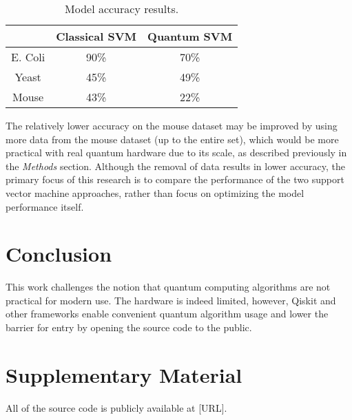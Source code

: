 \documentclass{article}
\begin{document}
    \begin{table}[h]
      \centering
      \begin{tabular}{c|c|c|}
      \cline{2-3}
                                    & Classical SVM & Quantum SVM \\ \hline
      \multicolumn{1}{|c|}{E. Coli} & 90\%          & 70\%        \\ \hline
      \multicolumn{1}{|c|}{Yeast}   & 45\%          & 49\%        \\ \hline
      \multicolumn{1}{|c|}{Mouse}   & 43\%          & 22\%        \\ \hline
      \end{tabular}
      \caption{\label{table:accuracy}Model accuracy results.}
    \end{table}

    The relatively lower accuracy on the mouse dataset may be improved by using more data from the mouse dataset (up to the entire set), which would be more practical with real quantum hardware due to its scale, as described previously in the \textit{Methods} section. Although the removal of data results in lower accuracy, the primary focus of this research is to compare the performance of the two support vector machine approaches, rather than focus on optimizing the model performance itself.

\section{Conclusion}
  This work challenges the notion that quantum computing algorithms are not practical for modern use. The hardware is indeed limited, however, Qiskit and other frameworks enable convenient quantum algorithm usage and lower the barrier for entry by opening the source code to the public.

\section{Supplementary Material}
All of the source code is publicly available at [URL].

\newpage

\raggedright

\end{document}
